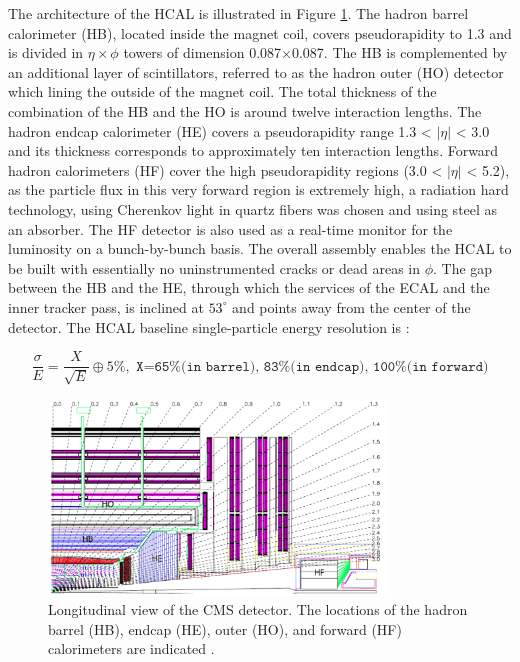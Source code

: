 The architecture of the HCAL is illustrated in Figure \ref{fig:CMS_HCAL}. The hadron barrel calorimeter (HB), located inside the magnet coil, covers pseudorapidity to 1.3 and is divided in $\eta\times\phi$ towers of dimension 0.087$\times$0.087. The HB is complemented by an additional layer of scintillators, referred to as the hadron outer (HO) detector which lining the outside of the magnet coil. The total thickness of the combination of the HB and the HO is around twelve interaction lengths. The hadron endcap calorimeter (HE) covers a pseudorapidity range 1.3 < $|\eta|$ < 3.0 and its thickness corresponds to approximately ten interaction lengths. Forward hadron calorimeters (HF) cover the high pseudorapidity regions (3.0 < $|\eta|$ < 5.2), as the particle flux in this very forward region is extremely high, a radiation hard technology, using Cherenkov light in quartz fibers was chosen and using steel as an absorber. The HF detector is also used as a real-time monitor for the luminosity on a bunch-by-bunch basis.
The overall assembly enables the HCAL to be built with essentially no uninstrumented cracks or dead areas in $\phi$. The gap between the HB and the HE, through which the services of the ECAL and the inner tracker pass, is inclined at $53^{\circ}$ and points away from the center of the detector.
The HCAL baseline single-particle energy resolution is \cite{CERN-LHCC-97-031}:

\begin{equation}
\frac{\sigma}{E}=\frac{X}{\sqrt{E}}\oplus5\%, \texttt{~X=65\% (in barrel), 83\% (in endcap), 100\% (in forward)}
\label{eq:HCAL_resolution}
\end{equation}




\begin{figure}[h!]
\begin{center}
\includegraphics[width=0.8\textwidth]{figures/CMS/HCAL/HCAL.png}
\caption{Longitudinal view of the CMS detector. The locations of the hadron barrel (HB), endcap (HE), outer (HO), and forward (HF) calorimeters are indicated \cite{Chatrchyan:2008aa}.}
\label{fig:CMS_HCAL}
\end{center}
\end{figure}


